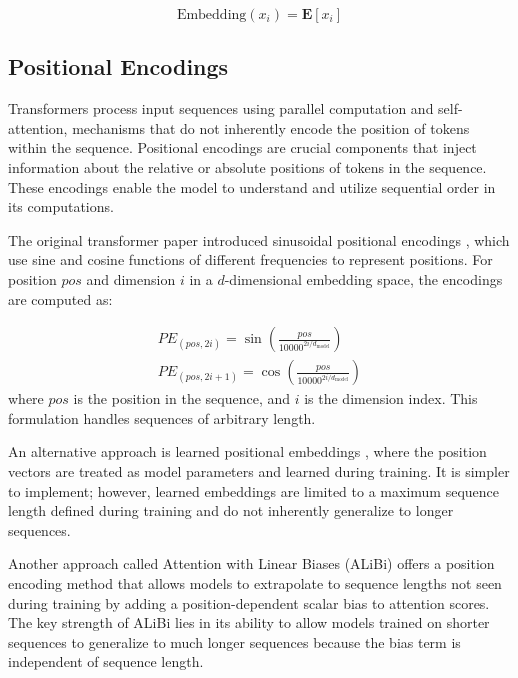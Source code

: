 \begin{equation}
\text{Embedding}(x_i) = \mathbf{E}[x_i]
\end{equation}



\subsection{Positional Encodings}
Transformers process input sequences using parallel computation and self-attention, mechanisms that do not inherently encode the position of tokens within the sequence. Positional encodings are crucial components that inject information about the relative or absolute positions of tokens in the sequence. These encodings enable the model to understand and utilize sequential order in its computations.

The original transformer paper introduced sinusoidal positional encodings \cite{vaswani2017attention}, which use sine and cosine functions of different frequencies to represent positions. For position $pos$ and dimension $i$ in a $d$-dimensional embedding space, the encodings are computed as:


\begin{equation}
\begin{aligned}
PE_{(pos,2i)} = \sin\left(\frac{pos}{10000^{2i/d_{\text{model}}}}\right) \\
PE_{(pos,2i+1)} = \cos\left(\frac{pos}{10000^{2i/d_{\text{model}}}}\right)
\end{aligned}
\end{equation}
where $pos$ is the position in the sequence, and $i$ is the dimension index. This formulation handles sequences of arbitrary length. 


An alternative approach is learned positional embeddings \cite{devlin2019bertpretrainingdeepbidirectional}, where the position vectors are treated as model parameters and learned during training. It is simpler to implement; however, learned embeddings are limited to a maximum sequence length defined during training and do not inherently generalize to longer sequences.

Another approach called Attention with Linear Biases (ALiBi) \cite{press2022trainshorttestlong} offers a position encoding method that allows models to extrapolate to sequence lengths not seen during training by adding a position-dependent scalar bias to attention scores. The key strength of ALiBi lies in its ability to allow models trained on shorter sequences to generalize to much longer sequences because the bias term is independent of sequence length.


